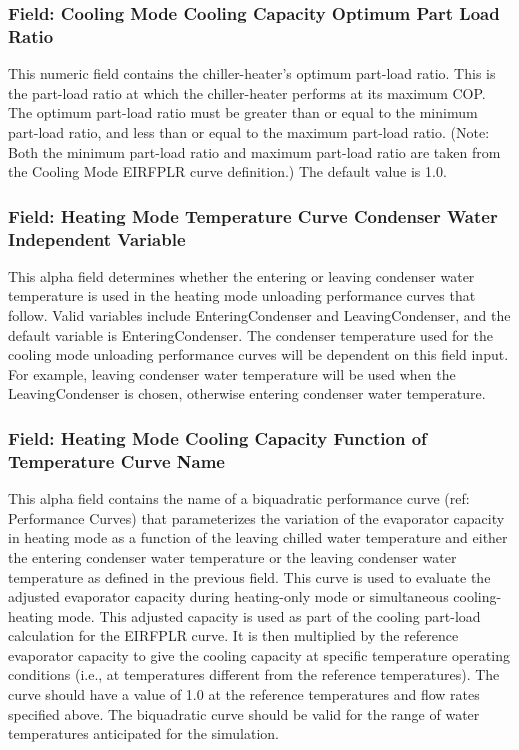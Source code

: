 \subsubsection{Field: Cooling Mode Cooling Capacity Optimum Part Load Ratio}\label{field-cooling-mode-cooling-capacity-optimum-part-load-ratio}

This numeric field contains the chiller-heater's optimum part-load ratio. This is the part-load ratio at which the chiller-heater performs at its maximum COP. The optimum part-load ratio must be greater than or equal to the minimum part-load ratio, and less than or equal to the maximum part-load ratio. (Note: Both the minimum part-load ratio and maximum part-load ratio are taken from the Cooling Mode EIRFPLR curve definition.) The default value is 1.0.

\subsubsection{Field: Heating Mode Temperature Curve Condenser Water Independent Variable}\label{field-heating-mode-temperature-curve-condenser-water-independent-variable}

This alpha field determines whether the entering or leaving condenser water temperature is used in the heating mode unloading performance curves that follow. Valid variables include EnteringCondenser and LeavingCondenser, and the default variable is EnteringCondenser. The condenser temperature used for the cooling mode unloading performance curves will be dependent on this field input. For example, leaving condenser water temperature will be used when the LeavingCondenser is chosen, otherwise entering condenser water temperature.

\subsubsection{Field: Heating Mode Cooling Capacity Function of Temperature Curve Name}\label{field-heating-mode-cooling-capacity-function-of-temperature-curve-name}

This alpha field contains the name of a biquadratic performance curve (ref: Performance Curves) that parameterizes the variation of the evaporator capacity in heating mode as a function of the leaving chilled water temperature and either the entering condenser water temperature or the leaving condenser water temperature as defined in the previous field. This curve is used to evaluate the adjusted evaporator capacity during heating-only mode or simultaneous cooling-heating mode. This adjusted capacity is used as part of the cooling part-load calculation for the EIRFPLR curve. It is then multiplied by the reference evaporator capacity to give the cooling capacity at specific temperature operating conditions (i.e., at temperatures different from the reference temperatures). The curve should have a value of 1.0 at the reference temperatures and flow rates specified above. The biquadratic curve should be valid for the range of water temperatures anticipated for the simulation.

